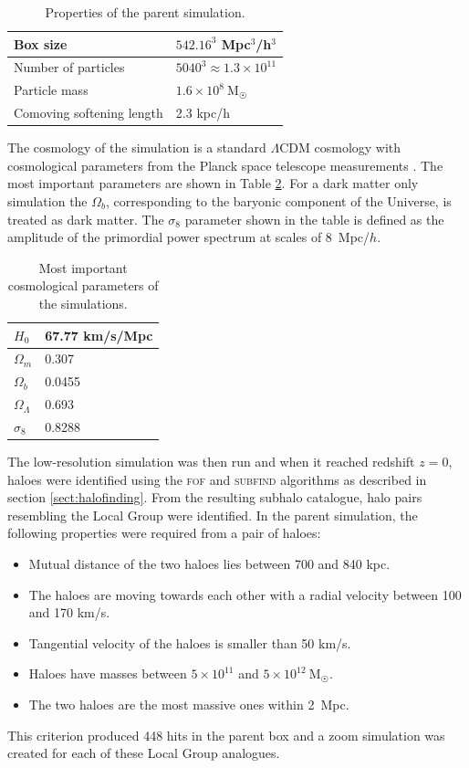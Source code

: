 \documentclass[english, oneside]{HYgradu}
\begin{document}
\begin{table}
	\centering
	\begin{tabular}{| l | l |}
		\hline
		Box size & $542.16^3$ Mpc$^3$/h$^3$ \\ \hline
		Number of particles & $5040^3 \approx 1.3 \times 10^{11}$ \\ \hline
		Particle mass & $1.6 \times 10^8~\mathrm{M_{\astrosun}}$ \\ \hline
		Comoving softening length & 2.3 kpc/h \\ \hline
	\end{tabular}
	\caption{Properties of the parent simulation.} \label{tab:parentBox}
\end{table}

The cosmology of the simulation is a standard $\Lambda$CDM cosmology with cosmological parameters from the Planck space telescope measurements \citep{planck2014resultsXVI}. The most important parameters are shown in Table \ref{tab:cosmopars}. For a dark matter only simulation the $\Omega_b$, corresponding to the baryonic component of the Universe, is treated as dark matter. The $\sigma_8$ parameter shown in the table is defined as the amplitude of the primordial power spectrum at scales of 8~Mpc/$h$.

\begin{table}
	\centering
	\begin{tabular}{| l | l |}
		\hline
		$H_0$ & 67.77 km/s/Mpc\\ \hline
		$\Omega_m$ & 0.307 \\ \hline
		$\Omega_b$ & 0.0455 \\ \hline
		$\Omega_\Lambda$ & 0.693 \\ \hline
		$\sigma_8$ & 0.8288 \\ \hline
	\end{tabular}
	\caption{Most important cosmological parameters of the simulations.} \label{tab:cosmopars}
\end{table}

The low-resolution simulation was then run and when it reached redshift $z=0$, haloes were identified using the \textsc{fof} and \textsc{subfind} algorithms as described in section \ref{sect:halofinding}. From the resulting subhalo catalogue, halo pairs resembling the Local Group were identified. In the parent simulation, the following properties were required from a pair of haloes:
\begin{itemize}
\item Mutual distance of the two haloes lies between 700 and 840 kpc.
\item The haloes are moving towards each other with a radial velocity between 100 and 170 km/s.
\item Tangential velocity of the haloes is smaller than 50 km/s.
\item Haloes have masses between $5 \times 10^{11}$ and $5 \times 10^{12}~\mathrm{M}_{\astrosun}$.
\item The two haloes are the most massive ones within 2~Mpc.
\end{itemize}
This criterion produced 448 hits in the parent box and a zoom simulation was created for each of these Local Group analogues.
\end{document}
